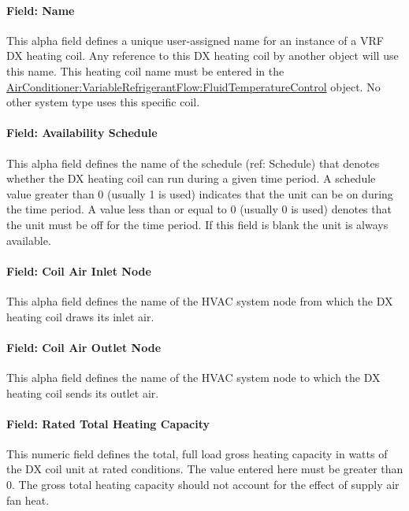 \paragraph{Field: Name}\label{field-name-8-006}

This alpha field defines a unique user-assigned name for an instance of a VRF DX heating coil. Any reference to this DX heating coil by another object will use this name. This heating coil name must be entered in the \hyperref[airconditionervariablerefrigerantflowfluidtemperaturecontrol]{AirConditioner:VariableRefrigerantFlow:FluidTemperatureControl} object. No other system type uses this specific coil.

\paragraph{Field: Availability Schedule}\label{field-availability-schedule}

This alpha field defines the name of the schedule (ref: Schedule) that denotes whether the DX heating coil can run during a given time period. A schedule value greater than 0 (usually 1 is used) indicates that the unit can be on during the time period. A value less than or equal to 0 (usually 0 is used) denotes that the unit must be off for the time period. If this field is blank the unit is always available.

\paragraph{Field: Coil Air Inlet Node}\label{field-coil-air-inlet-node-2}

This alpha field defines the name of the HVAC system node from which the DX heating coil draws its inlet air.

\paragraph{Field: Coil Air Outlet Node}\label{field-coil-air-outlet-node-2}

This alpha field defines the name of the HVAC system node to which the DX heating coil sends its outlet air.

\paragraph{Field: Rated Total Heating Capacity}\label{field-rated-total-heating-capacity}

This numeric field defines the total, full load gross heating capacity in watts of the DX coil unit at rated conditions. The value entered here must be greater than 0. The gross total heating capacity should not account for the effect of supply air fan heat.

